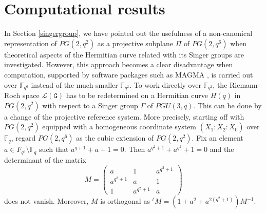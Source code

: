 \documentclass[9pt]{article}
\theoremstyle{plain}
\begin{document}
\section{Computational results}\label{sec6}
In Section \ref{singergroup}, we have pointed out the usefulness of  a non-canonical representation of $PG(2,q^2)$ as a projective subplane $\Pi$ of $PG(2,q^6)$ when theoretical aspects of the Hermitian curve related with its Singer groups are investigated. However, this approach becomes a clear  disadvantage when computation, supported by software packages such as MAGMA \cite{magma}, is carried out over $\mathbb{F}_{q^6}$ instead of the much smaller $\mathbb{F}_{q^2}$. To work directly over $\mathbb{F}_{q^2}$, the Riemann-Roch space $\mathcal{L}(\mathtt{G})$ has to be redetermined on a Hermitian curve $H(q)$ in $PG(2,q^2)$ with respect to a Singer group $\Gamma$ of $PGU(3,q)$. This can be done by a change of the projective reference system. More precisely, starting off with $PG(2,q^2)$ equipped with a homogeneous coordinate system $(\bar{X}_1:\bar{X}_2:\bar{X}_0)$ over $\mathbb{F}_q$, regard $PG(2,q^6)$ as the cubic extension of $PG(2,q^2)$. Fix an element $a\in F_{q^3}\setminus \mathbb{F}_q$ such that $a^{q+1}+a+1=0$. Then $a^{q^2+1}+a^{q^2}+1=0$ and the determinant of the matrix 
\[M=\left(\begin{array}{ccc} 
a   & 1  & a^{q^2+1}\\
a^{q^2+1}  & a  & 1 \\
 1 & a^{q^2+1} & a
\end{array}\right)\]
does not vanish. Moreover, $M$ is orthogonal as $^tM=(1+a^2+a^{2(q^2+1)})M^{-1}$.  
\end{document}

